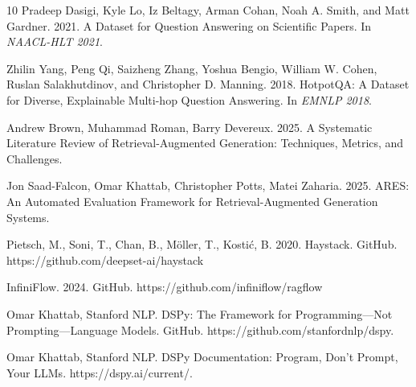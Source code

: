 \documentclass[11pt]{article}
\begin{document}
\begin{thebibliography}{10}
Pradeep Dasigi, Kyle Lo, Iz Beltagy, Arman Cohan, Noah A. Smith, and Matt Gardner. 2021.
A Dataset for Question Answering on Scientific Papers. In \emph{NAACL-HLT 2021}.

Zhilin Yang, Peng Qi, Saizheng Zhang, Yoshua Bengio, William W. Cohen, Ruslan Salakhutdinov, and Christopher D. Manning. 2018.
HotpotQA: A Dataset for Diverse, Explainable Multi-hop Question Answering. In \emph{EMNLP 2018}.

Andrew Brown, Muhammad Roman, Barry Devereux. 2025.
A Systematic Literature Review of Retrieval-Augmented Generation: Techniques, Metrics, and Challenges. 

Jon Saad-Falcon, Omar Khattab, Christopher Potts, Matei Zaharia. 2025.
ARES: An Automated Evaluation Framework for Retrieval-Augmented Generation Systems.

Pietsch, M., Soni, T., Chan, B., Möller, T., Kostić, B. 2020. 
Haystack. GitHub. https://github.com/deepset-ai/haystack

InfiniFlow. 2024. GitHub. https://github.com/infiniflow/ragflow 

Omar Khattab, Stanford NLP.
DSPy: The Framework for Programming—Not Prompting—Language Models.
GitHub. https://github.com/stanfordnlp/dspy.

Omar Khattab, Stanford NLP.
DSPy Documentation: Program, Don't Prompt, Your LLMs.
https://dspy.ai/current/.

\end{thebibliography}


%
%
\end{document}
